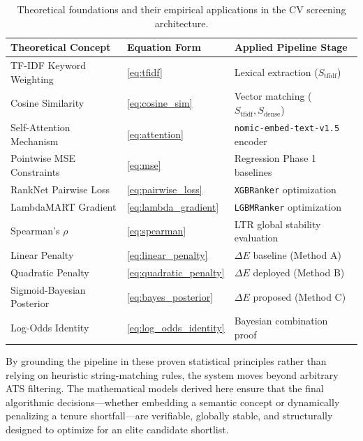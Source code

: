 \begin{table}[H]
\centering
\caption{Theoretical foundations and their empirical applications in the CV screening architecture.}
\label{tab:theory_summary}
\small
\begin{tabular}{@{}>{\raggedright\arraybackslash}p{4.2cm}>{\raggedright\arraybackslash}p{3.4cm}>{\raggedright\arraybackslash}p{5.0cm}@{}}
\toprule
\textbf{Theoretical Concept} & \textbf{Equation Form} & \textbf{Applied Pipeline Stage} \\
\midrule
TF-IDF Keyword Weighting & \eqref{eq:tfidf} & Lexical extraction ($S_{\text{tfidf}}$) \\
Cosine Similarity & \eqref{eq:cosine_sim} & Vector matching ($S_{\text{tfidf}},S_{\text{dense}}$) \\
Self-Attention Mechanism & \eqref{eq:attention} & \texttt{nomic-embed-text-v1.5} encoder \\
Pointwise MSE Constraints & \eqref{eq:mse} & Regression Phase 1 baselines \\
RankNet Pairwise Loss & \eqref{eq:pairwise_loss} & \texttt{XGBRanker} optimization \\
LambdaMART Gradient & \eqref{eq:lambda_gradient} & \texttt{LGBMRanker} optimization \\
Spearman's $\rho$ & \eqref{eq:spearman} & LTR global stability evaluation \\
Linear Penalty & \eqref{eq:linear_penalty} & $\Delta E$ baseline (Method A) \\
Quadratic Penalty & \eqref{eq:quadratic_penalty} & $\Delta E$ deployed (Method B) \\
Sigmoid-Bayesian Posterior & \eqref{eq:bayes_posterior} & $\Delta E$ proposed (Method C) \\
Log-Odds Identity & \eqref{eq:log_odds_identity} & Bayesian combination proof \\
\bottomrule
\end{tabular}
\end{table}

By grounding the pipeline in these proven statistical principles rather than relying on heuristic string-matching rules, the system moves beyond arbitrary ATS filtering. The mathematical models derived here ensure that the final algorithmic decisions---whether embedding a semantic concept or dynamically penalizing a tenure shortfall---are verifiable, globally stable, and structurally designed to optimize for an elite candidate shortlist.